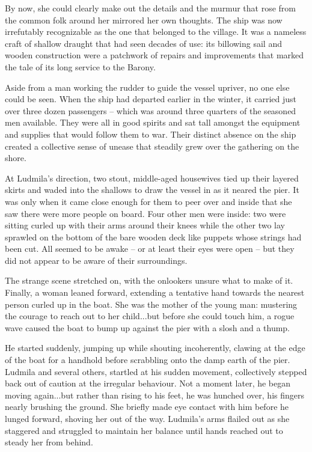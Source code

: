  

By now, she could clearly make out the details and the murmur that rose from the common folk around her mirrored her own thoughts. The ship was now irrefutably recognizable as the one that belonged to the village. It was a nameless craft of shallow draught that had seen decades of use: its billowing sail and wooden construction were a patchwork of repairs and improvements that marked the tale of its long service to the Barony.

 

Aside from a man working the rudder to guide the vessel upriver, no one else could be seen. When the ship had departed earlier in the winter, it carried just over three dozen passengers – which was around three quarters of the seasoned men available. They were all in good spirits and sat tall amongst the equipment and supplies that would follow them to war. Their distinct absence on the ship created a collective sense of unease that steadily grew over the gathering on the shore.

 

At Ludmila’s direction, two stout, middle-aged housewives tied up their layered skirts and waded into the shallows to draw the vessel in as it neared the pier. It was only when it came close enough for them to peer over and inside that she saw there were more people on board. Four other men were inside: two were sitting curled up with their arms around their knees while the other two lay sprawled on the bottom of the bare wooden deck like puppets whose strings had been cut. All seemed to be awake – or at least their eyes were open – but they did not appear to be aware of their surroundings.

 

The strange scene stretched on, with the onlookers unsure what to make of it. Finally, a woman leaned forward, extending a tentative hand towards the nearest person curled up in the boat. She was the mother of the young man: mustering the courage to reach out to her child...but before she could touch him, a rogue wave caused the boat to bump up against the pier with a slosh and a thump.

 

He started suddenly, jumping up while shouting incoherently, clawing at the edge of the boat for a handhold before scrabbling onto the damp earth of the pier. Ludmila and several others, startled at his sudden movement, collectively stepped back out of caution at the irregular behaviour. Not a moment later, he began moving again...but rather than rising to his feet, he was hunched over, his fingers nearly brushing the ground. She briefly made eye contact with him before he lunged forward, shoving her out of the way. Ludmila's arms flailed out as she staggered and struggled to maintain her balance until hands reached out to steady her from behind.

